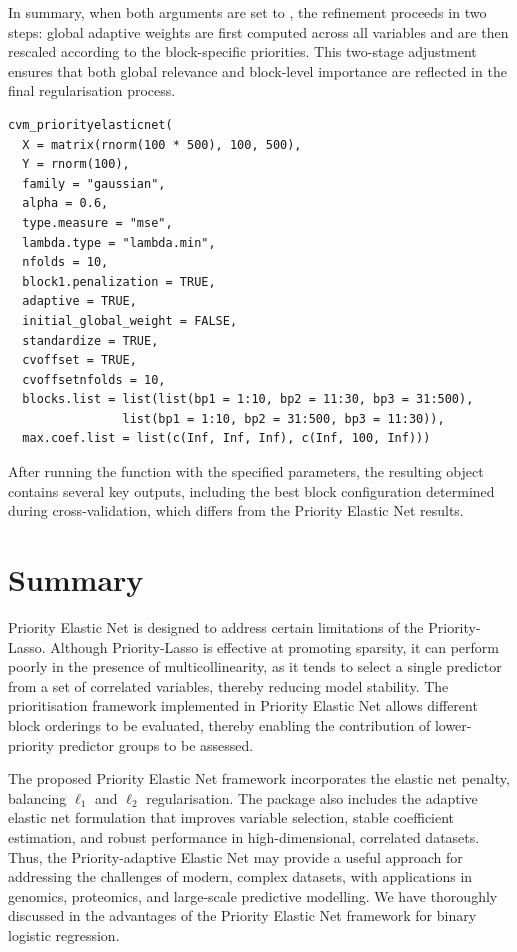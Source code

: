 In summary, when both arguments are set to , the refinement proceeds in two steps: global adaptive weights are first computed across all variables and are then rescaled according to the block-specific priorities. This two-stage adjustment ensures that both global relevance and block-level importance are reflected in the final regularisation process.

{\small
\begin{lstlisting}
cvm_priorityelasticnet(
  X = matrix(rnorm(100 * 500), 100, 500),
  Y = rnorm(100),
  family = "gaussian",
  alpha = 0.6,
  type.measure = "mse",
  lambda.type = "lambda.min",
  nfolds = 10,
  block1.penalization = TRUE,
  adaptive = TRUE,
  initial_global_weight = FALSE,
  standardize = TRUE,
  cvoffset = TRUE,
  cvoffsetnfolds = 10,
  blocks.list = list(list(bp1 = 1:10, bp2 = 11:30, bp3 = 31:500),
                list(bp1 = 1:10, bp2 = 31:500, bp3 = 11:30)),
  max.coef.list = list(c(Inf, Inf, Inf), c(Inf, 100, Inf)))
\end{lstlisting}
}

After running the function with the specified parameters, the resulting object contains several key outputs, including the best block configuration determined during cross-validation, which differs from the Priority Elastic Net results.

\hypertarget{Summary}{%
\section{Summary}}

Priority Elastic Net is designed to address certain limitations of the Priority-Lasso. Although Priority-Lasso is effective at promoting sparsity, it can perform poorly in the presence of multicollinearity, as it tends to select a single predictor from a set of correlated variables, thereby reducing model stability. The prioritisation framework implemented in Priority Elastic Net allows different block orderings to be evaluated, thereby enabling the contribution of lower-priority predictor groups to be assessed.

The proposed Priority Elastic Net framework \citep{musib2025priorityelasticnet} incorporates the elastic net penalty, balancing $\ell_1$ and $\ell_2$ regularisation. The package also includes the adaptive elastic net formulation that improves variable selection, stable coefficient estimation, and robust performance in high-dimensional, correlated datasets.
Thus, the Priority-adaptive Elastic Net may provide a useful approach for addressing the challenges of modern, complex datasets, with applications in genomics, proteomics, and large-scale predictive modelling. We have thoroughly discussed in \cite{musib2024priority} the advantages of the Priority Elastic Net framework for binary logistic regression. 

